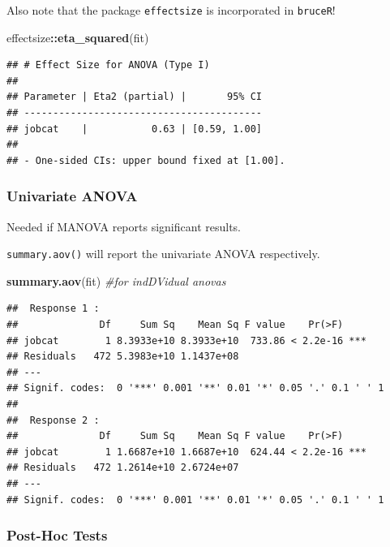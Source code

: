\documentclass[
]{ctexart}
\newenvironment{Shaded}{\begin{snugshade}}{\end{snugshade}}
\newcommand{\CommentTok}[1]{\textcolor[rgb]{0.56,0.35,0.01}{\textit{#1}}}
\newcommand{\FunctionTok}[1]{\textcolor[rgb]{0.13,0.29,0.53}{\textbf{#1}}}
\newcommand{\NormalTok}[1]{#1}
\newcommand{\SpecialCharTok}[1]{\textcolor[rgb]{0.81,0.36,0.00}{\textbf{#1}}}
\begin{document}
Also note that the package \texttt{effectsize} is incorporated in
\texttt{bruceR}!

\begin{Shaded}
\begin{Highlighting}[]
\NormalTok{effectsize}\SpecialCharTok{::}\FunctionTok{eta\_squared}\NormalTok{(fit)}
\end{Highlighting}
\end{Shaded}

\begin{verbatim}
## # Effect Size for ANOVA (Type I)
## 
## Parameter | Eta2 (partial) |       95% CI
## -----------------------------------------
## jobcat    |           0.63 | [0.59, 1.00]
## 
## - One-sided CIs: upper bound fixed at [1.00].
\end{verbatim}

\hypertarget{univariate-anova}{%
\subsubsection{Univariate ANOVA}\label{univariate-anova}}

Needed if MANOVA reports significant results.

\texttt{summary.aov()} will report the univariate ANOVA respectively.

\begin{Shaded}
\begin{Highlighting}[]
\FunctionTok{summary.aov}\NormalTok{(fit)  }\CommentTok{\#for indDVidual anovas}
\end{Highlighting}
\end{Shaded}

\begin{verbatim}
##  Response 1 :
##              Df     Sum Sq    Mean Sq F value    Pr(>F)    
## jobcat        1 8.3933e+10 8.3933e+10  733.86 < 2.2e-16 ***
## Residuals   472 5.3983e+10 1.1437e+08                      
## ---
## Signif. codes:  0 '***' 0.001 '**' 0.01 '*' 0.05 '.' 0.1 ' ' 1
## 
##  Response 2 :
##              Df     Sum Sq    Mean Sq F value    Pr(>F)    
## jobcat        1 1.6687e+10 1.6687e+10  624.44 < 2.2e-16 ***
## Residuals   472 1.2614e+10 2.6724e+07                      
## ---
## Signif. codes:  0 '***' 0.001 '**' 0.01 '*' 0.05 '.' 0.1 ' ' 1
\end{verbatim}

\hypertarget{post-hoc-tests}{%
\subsubsection{Post-Hoc Tests}\label{post-hoc-tests}}
\end{document}
